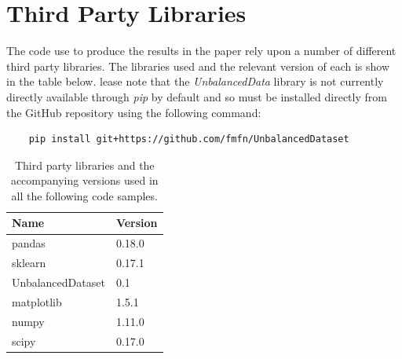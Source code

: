 \documentclass[journal]{IEEEtran}
\begin{document}

%

\clearpage
\onecolumn
\appendices

\section{Third Party Libraries}
The code use to produce the results in the paper rely upon a number of different third party libraries. The libraries used and the relevant version of each is show in the table below. lease note that the \textit{UnbalancedData} library is not currently directly available through \textit{pip} by default and so must be installed directly from the GitHub repository using the following command:

\begin{lstlisting}
	pip install git+https://github.com/fmfn/UnbalancedDataset
\end{lstlisting}

\begin{table}[H]
\centering
\caption{Third party libraries and the accompanying versions used in all the following code samples.}
\label{my-label}
\begin{tabular}{|l|l|}
\hline
\textbf{Name}     & \textbf{Version} \\ \hline
pandas            & 0.18.0           \\ \hline
sklearn           & 0.17.1           \\ \hline
UnbalancedDataset & 0.1              \\ \hline
matplotlib        & 1.5.1            \\ \hline
numpy             & 1.11.0           \\ \hline
scipy             & 0.17.0           \\ \hline
\end{tabular}
\end{table}
\end{document}
